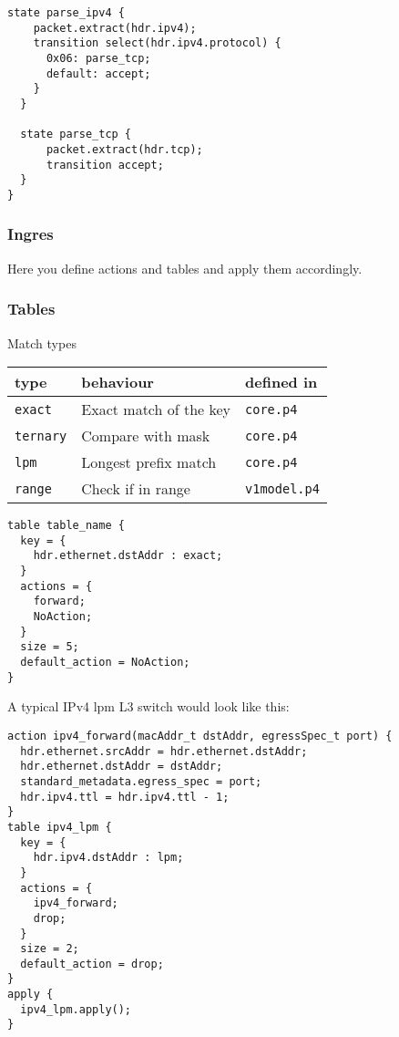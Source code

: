 \documentclass[a4paper, fontsize=8pt, landscape, DIV=1]{scrartcl}
\begin{document}
\begin{multicols*}{3}
\begin{lstlisting}[style=P4style]
  state parse_ipv4 {
    packet.extract(hdr.ipv4);
    transition select(hdr.ipv4.protocol) {
      0x06: parse_tcp;
      default: accept;
    } 
  }

  state parse_tcp {
      packet.extract(hdr.tcp);
      transition accept;
  }
}\end{lstlisting}

  \subsubsection{Ingres}
  Here you define actions and tables and apply them accordingly.

  \subsubsection{Tables}
  Match types

  \begin{tabularx}{\linewidth}{ l X l}
  \hline type & behaviour & defined in \\ \hline
    \lstinline[style=P4style]!exact! &
    Exact match of the key & \texttt{core.p4} \\
    \lstinline[style=P4style]!ternary! &
    Compare with mask & \texttt{core.p4} \\
    \lstinline[style=P4style]!lpm! &
    Longest prefix match & \texttt{core.p4} \\
    \lstinline[style=P4style]!range! &
    Check if in range & \texttt{v1model.p4} \\ \hline
  \end{tabularx}

  \begin{lstlisting}[style=P4style]
table table_name {
  key = {
    hdr.ethernet.dstAddr : exact;
  }
  actions = {
    forward;
    NoAction;
  }
  size = 5;
  default_action = NoAction;
}\end{lstlisting}

A typical IPv4 lpm L3 switch would look like this:
  \begin{lstlisting}[style=P4style]
action ipv4_forward(macAddr_t dstAddr, egressSpec_t port) {
  hdr.ethernet.srcAddr = hdr.ethernet.dstAddr;
  hdr.ethernet.dstAddr = dstAddr;
  standard_metadata.egress_spec = port;
  hdr.ipv4.ttl = hdr.ipv4.ttl - 1;
}
table ipv4_lpm {
  key = {
    hdr.ipv4.dstAddr : lpm;
  }
  actions = {
    ipv4_forward;
    drop;
  }
  size = 2;
  default_action = drop;
}
apply {
  ipv4_lpm.apply();
}\end{lstlisting}


\end{multicols*}
\end{document}
